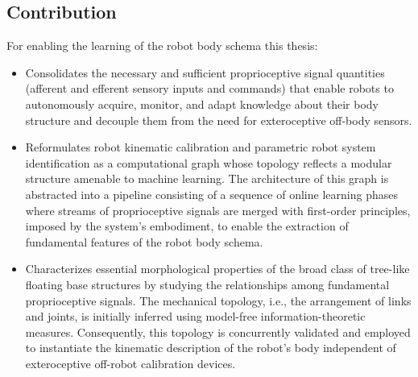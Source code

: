 \documentclass[12pt, a4paper]{article}
\newcommand{\redtext}[1]{\textcolor{red}{#1}}
\begin{document}
\subsection*{Contribution}
For enabling the learning of the robot body schema this thesis:
\begin{itemize}
	\item Consolidates the necessary and sufficient proprioceptive signal quantities (afferent and efferent sensory inputs and commands) that enable robots to autonomously acquire, monitor, and adapt knowledge about their body structure and decouple them from the need for exteroceptive off-body sensors.

    \item Reformulates robot kinematic calibration and parametric robot system identification as a computational graph whose topology reflects a modular structure amenable to machine learning. The architecture of this graph is abstracted into a pipeline consisting of a sequence of online learning phases where streams of proprioceptive signals are merged with first-order principles, imposed by the system's embodiment, to enable the extraction of fundamental features of the robot body schema.

    \item Characterizes essential morphological properties of the broad class of tree-like floating base structures by studying the relationships among fundamental proprioceptive signals. The mechanical topology, i.e., the arrangement of links and joints, is initially inferred using model-free information-theoretic measures. Consequently, this topology is concurrently validated and employed to instantiate the kinematic description of the robot's body independent of exteroceptive off-robot calibration devices.
    

\end{itemize}
\end{document}
